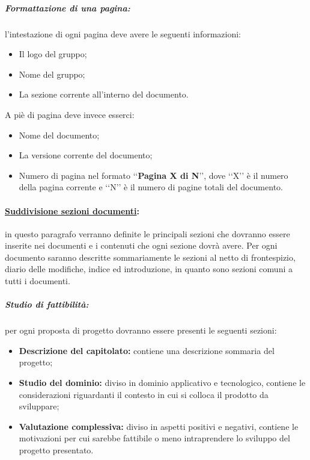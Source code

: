 \subparagraph{Formattazione di una pagina:}
l'intestazione di ogni pagina deve avere le seguenti informazioni:
\begin{itemize}
\item Il logo del gruppo;
\item Nome del gruppo;
\item La sezione corrente all'interno del documento.
\end{itemize}
A piè di pagina deve invece esserci:
\begin{itemize}
\item Nome del documento;
\item La versione corrente del documento;
\item Numero di pagina nel formato \lq\lq{}\textbf{Pagina X di N}\rq\rq{}, dove \lq\lq{}X\rq\rq{} è il numero della pagina corrente e \lq\lq{}N\rq\rq{} è il numero di pagine totali del documento.
\end{itemize}

\paragraph{\underline{Suddivisione sezioni documenti}:} in questo paragrafo verranno definite le principali sezioni che dovranno essere inserite nei documenti e i contenuti che ogni sezione dovrà avere. Per ogni documento saranno descritte sommariamente le sezioni al netto di frontespizio, diario delle modifiche, indice ed introduzione, in quanto sono sezioni comuni a tutti i documenti.

\subparagraph{Studio di fattibilità:} per ogni proposta di progetto dovranno essere presenti le seguenti sezioni:
\begin{itemize}
\item \textbf{Descrizione del capitolato:} contiene una descrizione sommaria del progetto;
\item \textbf{Studio del dominio:} diviso in dominio applicativo e tecnologico, contiene le considerazioni riguardanti il contesto in cui si colloca il prodotto da sviluppare;
\item \textbf{Valutazione complessiva:} diviso in aspetti positivi e negativi, contiene le motivazioni per cui sarebbe fattibile o meno intraprendere lo sviluppo del progetto presentato.
\end{itemize}

